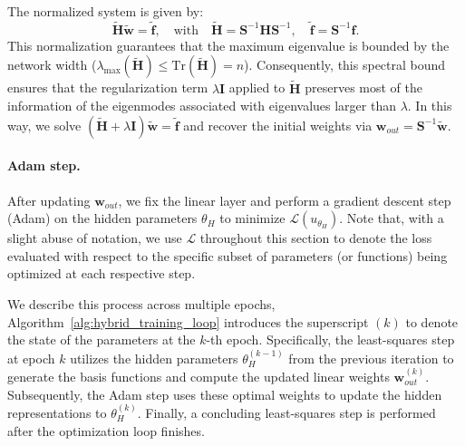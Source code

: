 \documentclass{article}
\theoremstyle{definition}
\begin{document}
The normalized system is given by:
\begin{equation}
    \tilde{\mathbf{H}} \tilde{\mathbf{w}} = \tilde{\mathbf{f}}, \quad \text{with} \quad \tilde{\mathbf{H}} = \mathbf{S}^{-1}\mathbf{H}\mathbf{S}^{-1}, \quad \tilde{\mathbf{f}} = \mathbf{S}^{-1}\mathbf{f}.
\end{equation}
This normalization guarantees that the maximum eigenvalue is bounded by the network width ($\lambda_{\max}(\tilde{\mathbf{H}}) \leq \text{Tr}(\tilde{\mathbf{H}}) = n$). Consequently, this spectral bound ensures that the regularization term $\lambda \mathbf{I}$ applied to $\tilde{\mathbf{H}}$ preserves most of the information of the eigenmodes associated with eigenvalues larger than $\lambda$.
In this way, we solve $(\tilde{\mathbf{H}} + \lambda \mathbf{I})\tilde{\mathbf{w}} = \tilde{\mathbf{f}}$ and recover the initial weights via $\mathbf{w}_{out} = \mathbf{S}^{-1}\tilde{\mathbf{w}}$.

\paragraph{Adam step.}
After updating $\mathbf{w}_{out}$, we fix the linear layer and perform a gradient descent step (Adam) on the hidden parameters $\theta_H$ to minimize $\mathcal{L}(u_{\theta_H})$. Note that, with a slight abuse of notation, we use $\mathcal{L}$ throughout this section to denote the loss evaluated with respect to the specific subset of parameters (or functions) being optimized at each respective step. 

We describe this process across multiple epochs, Algorithm~\ref{alg:hybrid_training_loop} introduces the superscript $(k)$ to denote the state of the parameters at the $k$-th epoch. Specifically, the least-squares step at epoch $k$ utilizes the hidden parameters $\theta_H^{(k-1)}$ from the previous iteration to generate the basis functions and compute the updated linear weights $\mathbf{w}_{out}^{(k)}$. Subsequently, the Adam step uses these optimal weights to update the hidden representations to $\theta_H^{(k)}$. Finally, a concluding least-squares step is performed after the optimization loop finishes.
\end{document}
